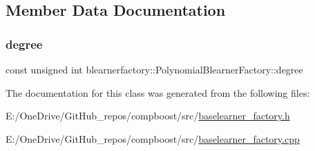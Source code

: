 \subsection{Member Data Documentation}
\mbox{\label{classblearnerfactory_1_1_polynomial_blearner_factory_a78c1852e3f1e1b43e6d8bef40032e19f}} 
\subsubsection{\texorpdfstring{degree}{degree}}
{\footnotesize\ttfamily const unsigned int blearnerfactory\+::\+Polynomial\+Blearner\+Factory\+::degree\hspace{0.3cm}{\ttfamily [private]}}



The documentation for this class was generated from the following files\+:\begin{DoxyCompactItemize}
\item 
E\+:/\+One\+Drive/\+Git\+Hub\+\_\+repos/compboost/src/\mbox{\hyperlink{baselearner__factory_8h}{baselearner\+\_\+factory.\+h}}\item 
E\+:/\+One\+Drive/\+Git\+Hub\+\_\+repos/compboost/src/\mbox{\hyperlink{baselearner__factory_8cpp}{baselearner\+\_\+factory.\+cpp}}\end{DoxyCompactItemize}
